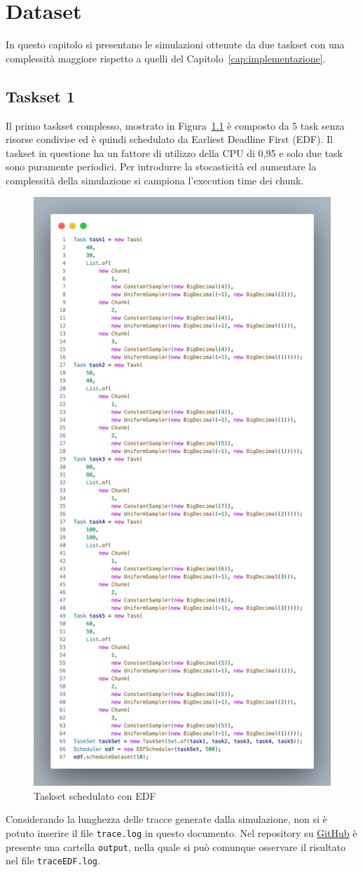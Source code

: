 \chapter{Dataset}
In questo capitolo si presentano le simulazioni ottenute da due taskset con una complessità maggiore rispetto a quelli del Capitolo~\ref{cap:implementazione}.

\section{Taskset 1}
Il primo taskset complesso, mostrato in Figura~\ref{fig:dataset1} è composto da 5 task senza risorse condivise ed è quindi schedulato da Earliest Deadline First (EDF). Il taskset in questione ha un fattore di utilizzo della CPU di 0,95 e solo due task sono puramente periodici. Per introdurre la stocasticità ed aumentare la complessità della simulazione si campiona l'execution time dei chunk.

\begin{figure}[htbp]
\includegraphics[width=.4\textwidth]{immagini/datasetEDF.pdf}
\centering
\caption{Taskset schedulato con EDF}
\label{fig:dataset1}
\end{figure}

Considerando la lunghezza delle tracce generate dalla simulazione, non si è potuto inserire il file \texttt{trace.log} in questo documento. Nel repository su \href{https://github.com/edoardosarri24/real-time-scheduling-simulator.git}{GitHub} è presente una cartella \texttt{output}, nella quale si può comunque osservare il risultato nel file \texttt{traceEDF.log}.

